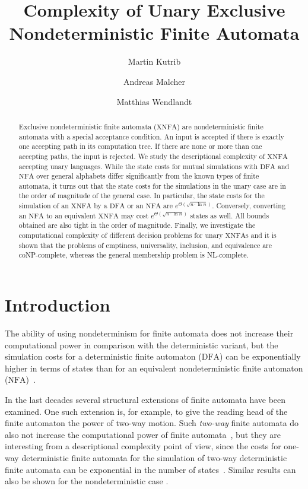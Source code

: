 \documentclass[final,copyright,noderivs]{eptcs}
\title{Complexity of Unary Exclusive\\ Nondeterministic Finite Automata}
\author{Martin Kutrib \and Andreas Malcher \and Matthias Wendlandt
\institute{%
  Institut f\"ur Informatik, Universit\"at Giessen\\
  Arndtstr.~2, 35392 Giessen, Germany}
\email{$\{$kutrib, andreas.malcher, matthias.wendlandt$\}$@informatik.uni-giessen.de}
}
\theoremstyle{plain}
\theoremstyle{definition}
\newcommand{\dfa}{\textrm{DFA}}
\newcommand{\nfa}{\textrm{NFA}}
\newcommand{\xnfa}{\textrm{XNFA}}
\begin{document}
\maketitle

\begin{abstract}
Exclusive nondeterministic finite automata ($\xnfa$) are nondeterministic
finite automata with a special acceptance condition.
An input is accepted if there is exactly one accepting path in its
computation tree. If there are none or more than one accepting paths,
the input is rejected. We study the descriptional complexity 
of $\xnfa$ accepting unary languages. While the state costs for 
mutual simulations with $\dfa$ and $\nfa$ over general alphabets 
differ significantly from the known types of finite 
automata, it turns out that the state costs for the simulations
in the unary case are in the order of magnitude of the general case.
In particular, the state costs for the simulation of an 
$\xnfa$ by a $\dfa$ or an $\nfa$ are $e^{\Theta(\sqrt{n\cdot\ln n})}$.
Conversely, converting an $\nfa$ to an equivalent $\xnfa$ may
cost $e^{\Theta(\sqrt{n\cdot\ln n})}$ states as well. 
All bounds obtained are also tight in the order of magnitude. 
Finally, we investigate the computational complexity of different decision
problems for unary $\xnfa$s and it is shown that the problems of emptiness, universality, inclusion, 
and equivalence are {\sf coNP}-complete, whereas the general membership problem is 
{\sf NL}-complete.
%
\end{abstract}

\section{Introduction}

The ability of using nondeterminism for finite automata does not increase their computational power 
in comparison with the deterministic variant, but the simulation costs for a deterministic finite automaton ($\dfa$)
can be exponentially higher in terms of states than for an equivalent nondeterministic finite 
automaton ($\nfa$)~\cite{Meyer:1971:edagfs,moore:1971:bssspe}.

In the last decades several structural extensions of finite automata have been examined.
One such extension is, for example, to give the reading head of the finite automaton the power of two-way motion.
Such \emph{two-way} finite automata do also not increase the computational power of
finite automata~\cite{Rabin:1959:fadp}, but they are interesting from a descriptional complexity point of
view, since the costs for one-way deterministic finite automata for the simulation of two-way deterministic finite automata 
can be exponential in the number of states~\cite{moore:1971:bssspe}. Similar results can also be shown 
for the nondeterministic case \cite{Sakoda:1978:NST}.
\end{document}
